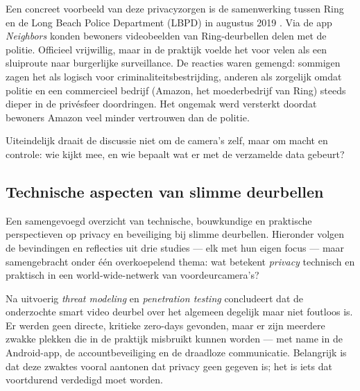 \documentclass[nonacm, sigconf]{acmart}
\begin{document}
    Een concreet voorbeeld van deze privacyzorgen is de samenwerking tussen Ring en de Long Beach Police Department (LBPD) in augustus 2019 \parencite{shaffer2021applying}.
    Via de app \textit{Neighbors} konden bewoners videobeelden van Ring-deurbellen delen met de politie.
    Officieel vrijwillig, maar in de praktijk voelde het voor velen als een sluiproute naar burgerlijke surveillance.
    De reacties waren gemengd: sommigen zagen het als logisch voor criminaliteitsbestrijding, anderen als zorgelijk omdat politie en een commercieel bedrijf (Amazon, het moederbedrijf van Ring) steeds dieper in de privésfeer doordringen.
    Het ongemak werd versterkt doordat bewoners Amazon veel minder vertrouwen dan de politie.

    Uiteindelijk draait de discussie niet om de camera's zelf, maar om macht en controle: wie kijkt mee, en wie bepaalt wat er met de verzamelde data gebeurt?

    \subsection{Technische aspecten van slimme deurbellen}
    Een samengevoegd overzicht van technische, bouwkundige en praktische perspectieven op privacy en beveiliging bij slimme deurbellen. Hieronder volgen de bevindingen en reflecties uit drie studies — elk met hun eigen focus — maar samengebracht onder één overkoepelend thema: wat betekent \emph{privacy} technisch en praktisch in een world-wide-netwerk van voordeurcamera's?

    \parencite{liu2021ethical}

    Na uitvoerig \textit{threat modeling} en \textit{penetration testing} concludeert \parencite{liu2021ethical} dat de onderzochte smart video deurbel over het algemeen degelijk maar niet foutloos is. Er werden geen directe, kritieke zero-days gevonden, maar er zijn meerdere zwakke plekken die in de praktijk misbruikt kunnen worden — met name in de Android-app, de accountbeveiliging en de draadloze communicatie. Belangrijk is dat deze zwaktes vooral aantonen dat privacy geen gegeven is; het is iets dat voortdurend verdedigd moet worden.
\end{document}
